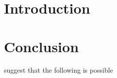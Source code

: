 

\newcommand{\courseName}{Subject Title}
\newcommand{\courseCode}{ELEC ENG 7059}
\newcommand{\dueDate}{01/01/2023}
\newcommand{\supervisors}{AsPr. Brian Ng}
\newcommand{\submissionType}{Radar Principles and Fundamentals}
\newcommand{\submissionTitle}{Practical Report 1\\ Radar Systems}
\newcommand{\headerTitle}{Radar Systems}




\FloatBarrier

\section{Introduction}
\FloatBarrier





\clearpage\section{Conclusion}
\FloatBarrier


\cite{Holdsworth2020} suggest that the following is possible

\autocite{fabrizioHighFrequencyHorizon2013}
    

\clearpage
\printbibliography %



